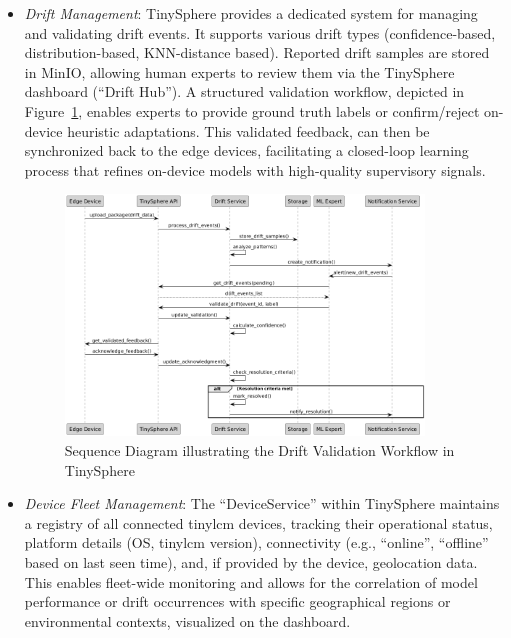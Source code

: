 \begin{itemize}
    \item \textit{Drift Management}: TinySphere provides a dedicated system for managing and validating drift events. It supports various drift types (confidence-based, distribution-based, KNN-distance based). Reported drift samples are stored in MinIO, allowing human experts to review them via the TinySphere dashboard (``Drift Hub''). A structured validation workflow, depicted in Figure~\ref{fig:drift_validation_workflow}, enables experts to provide ground truth labels or confirm/reject on-device heuristic adaptations. This validated feedback, can then be synchronized back to the edge devices, facilitating a closed-loop learning process that refines on-device models with high-quality supervisory signals.

    \begin{figure}[htbp]
        \centering
        \includegraphics[width=0.9\textwidth]{figs/framework/drift-validation-workflow.png}
        \caption[Drift Validation Workflow in TinySphere]{Sequence Diagram illustrating the Drift Validation Workflow in TinySphere}
        \label{fig:drift_validation_workflow}
    \end{figure}

    \item \textit{Device Fleet Management}: The ``DeviceService'' within TinySphere maintains a registry of all connected \gls{tinylcm} devices, tracking their operational status, platform details (OS, \gls{tinylcm} version), connectivity (e.g., ``online'', ``offline'' based on last seen time), and, if provided by the device, geolocation data. This enables fleet-wide monitoring and allows for the correlation of model performance or drift occurrences with specific geographical regions or environmental contexts, visualized on the dashboard.


\end{itemize}
